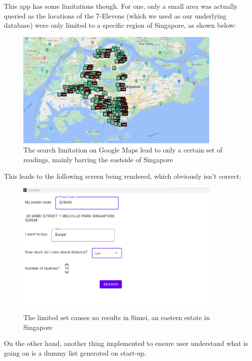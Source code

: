 \documentclass[12pt]{article}
\begin{document}
{This app has some limitations though. For one, only a small area was actually queried as the locations of the 7-Elevens (which we used as our underlying database) were only limited to a specific region of Singapore, as shown below:

\begin{figure}[ht]
    \centering
    \includegraphics[width=0.9\textwidth]{img/711locations.jpg}
    \caption{The search limitation on Google Maps lead to only a certain set of readings, mainly barring the eastside of Singapore}
    \label{fig:711locations}
\end{figure}

This leads to the following screen being rendered, which obviously isn't correct:

\begin{figure}[ht]
    \centering
    \includegraphics[width=0.9\textwidth]{img/pa2limitations.png}
    \caption{The limited set causes no results in Simei, an eastern estate in Singapore}
    \label{fig:pa2limitations}
\end{figure}

On the other hand, another thing implemented to ensure user understand what is going on is a dummy list generated on start-up.

}
\end{document}
